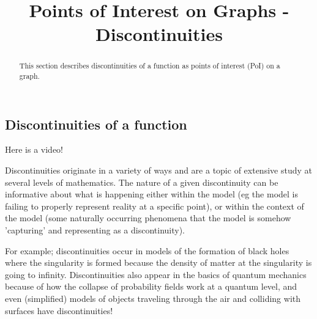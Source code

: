 \documentclass{ximera}
\title{Points of Interest on Graphs - Discontinuities}
\begin{document}
\begin{abstract}
    This section describes discontinuities of a function as points of interest (PoI) on a graph.
\end{abstract}
\maketitle


\subsection*{Discontinuities of a function}
    
    Here is a video!
    
    
    Discontinuities originate in a variety of ways and are a topic of extensive study at several levels of mathematics. The nature of a given discontinuity can be informative about what is happening either within the model (eg the model is failing to properly represent reality at a specific point), or within the context of the model (some naturally occurring phenomena that the model is somehow 'capturing' and representing as a discontinuity). 
    
    For example; discontinuities occur in models of the formation of black holes where the singularity is formed because the density of matter at the singularity is going to infinity. Discontinuities also appear in the basics of quantum mechanics because of how the collapse of probability fields work at a quantum level, and even (simplified) models of objects traveling through the air and colliding with surfaces have discontinuities!
    
\end{document}
